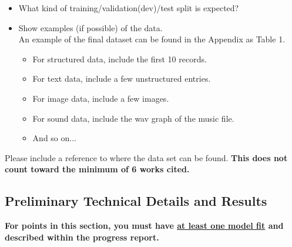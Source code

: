 \documentclass[conference]{IEEEtran}
\begin{document}
\begin{itemize}
  \item What kind of training/validation(dev)/test split is expected?

  \item Show examples (if possible) of the data. \\

  An example of the final dataset can be found in the Appendix as Table 1. \\

  \begin{itemize}
    \item For structured data, include the first 10 records.
    \item For text data, include a few unstructured entries.
    \item For image data, include a few images.
    \item For sound data, include the wav graph of the music file.
    \item And so on...
  \end{itemize}
\end{itemize}

Please include a reference to where the data set can be found. \textbf{This does not count toward the minimum of 6 works cited.}

\subsection{Preliminary Technical Details and Results}

\textbf{For points in this section, you must have \underline{at least one model fit} and described within the progress report.}
\end{document}
